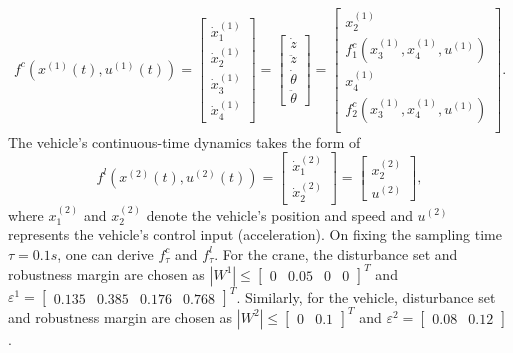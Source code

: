\[f^{c}(x^{(1)}(t),u^{(1)}(t))=\begin{bmatrix}
	\dot{x}_1^{(1)}\\
	\dot{x}_2^{(1)}\\
	\dot{x}_3^{(1)}\\
	\dot{x}_4^{(1)}
\end{bmatrix}=\begin{bmatrix}
\dot{z}\\
\ddot{z}\\
\dot{\theta}\\
\ddot{\theta}
\end{bmatrix}=
\begin{bmatrix}
	x_2^{(1)}\\
	f^c_1(x_3^{(1)},x_4^{(1)},u^{(1)})\\
	x_4^{(1)}\\
	f^c_2(x_3^{(1)},x_4^{(1)},u^{(1)})\\
\end{bmatrix}.\]
The vehicle's continuous-time dynamics takes the form of
\[f^{l}(x^{(2)}(t),u^{(2)}(t))=\begin{bmatrix}
\dot{x}_1^{(2)}\\ \dot{x}^{(2)}_2 \end{bmatrix}=\begin{bmatrix} x^{(2)}_2\\ u^{(2)} \end{bmatrix},
\]
where $x_1^{(2)}$ and $x_2^{(2)}$ denote the vehicle's position and speed and $u^{(2)}$ represents the vehicle's control input (acceleration). 
On fixing the sampling time $\tau=0.1s$, one can derive $f^c_\tau$ and $f^l_\tau$. For the crane, the disturbance set and robustness margin are chosen as $|W^1|\leq\begin{bmatrix}0&0.05&0&0\end{bmatrix}^T$ and  $\varepsilon^{1}=\begin{bmatrix}0.135&0.385&0.176 &0.768\end{bmatrix}^T$. Similarly, for the vehicle, disturbance set and robustness margin are chosen as $|W^2|\leq\begin{bmatrix}0&0.1\end{bmatrix}^T$ and $\varepsilon^{2}=\begin{bmatrix}0.08&0.12\end{bmatrix}$.

